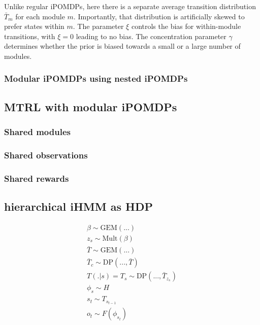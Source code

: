 \documentclass[11pt]{article}
\begin{document}
Unlike regular iPOMDPs, here there is a separate average transition distribution $\bar{T}_m$ for each module $m$. Importantly, that distribution is artificially skewed to prefer states within $m$. The parameter $\xi$ controls the bias for within-module transitions, with $\xi = 0$ leading to no bias. The concentration parameter $\gamma$ determines whether the prior is biased towards a small or a large number of modules.


\subsubsection{Modular iPOMDPs using nested iPOMDPs}






\subsection{MTRL with modular iPOMDPs}

\subsubsection{Shared modules}

\subsubsection{Shared observations}

\subsubsection{Shared rewards}





\subsection{hierarchical iHMM as HDP}


\begin{align*}
\beta \sim \text{GEM}(...) \\
z_s \sim \text{Mult}(\beta) \\
\bar{T} \sim \text{GEM}(...) \\
\bar{T}_c \sim \text{DP}(..., \bar{T}) \\
T(.|s) = T_s \sim \text{DP}(..., \bar{T}_{z_s}) \\
\phi_s \sim H \\
s_t \sim T_{s_{t-1}} \\
o_t \sim F(\phi_{s_t})
\end{align*}
\end{document}
